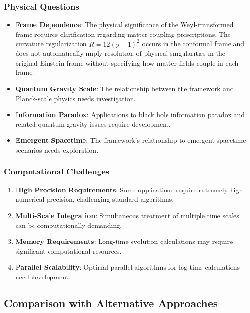 \subsubsection{Physical Questions}

\begin{itemize}
\item \textbf{Frame Dependence}: The physical significance of the Weyl-transformed frame requires clarification regarding matter coupling prescriptions. The curvature regularization $\tilde{R} = 12(p-1)^2$ occurs in the conformal frame and does not automatically imply resolution of physical singularities in the original Einstein frame without specifying how matter fields couple in each frame.

\item \textbf{Quantum Gravity Scale}: The relationship between the framework and Planck-scale physics needs investigation.

\item \textbf{Information Paradox}: Applications to black hole information paradox and related quantum gravity issues require development.

\item \textbf{Emergent Spacetime}: The framework's relationship to emergent spacetime scenarios needs exploration.
\end{itemize}

\subsubsection{Computational Challenges}

\begin{enumerate}
\item \textbf{High-Precision Requirements}: Some applications require extremely high numerical precision, challenging standard algorithms.
\item \textbf{Multi-Scale Integration}: Simultaneous treatment of multiple time scales can be computationally demanding.
\item \textbf{Memory Requirements}: Long-time evolution calculations may require significant computational resources.
\item \textbf{Parallel Scalability}: Optimal parallel algorithms for log-time calculations need development.
\end{enumerate}

\subsection{Comparison with Alternative Approaches}
\label{subsec:alternative_comparison}

